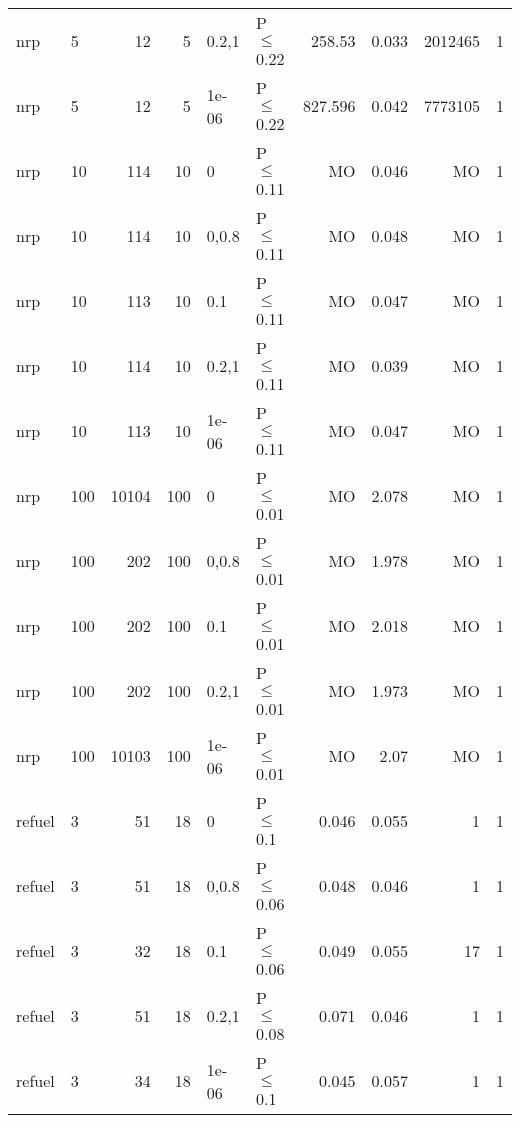 \begin{longtable}{llrrllrrrr}
 nrp           & 5        &     	12 &   5 & 0.2,1 & P$\leq$0.22  & 258.53  & 0.033   & 2012465 & 1    \\
 nrp           & 5        &     	12 &   5 & 1e-06 & P$\leq$0.22  & 827.596 & 0.042   & 7773105 & 1    \\
 nrp           & 10       &    	114 &  10 & 0     & P$\leq$0.11  & MO      & 0.046   & MO      & 1    \\
 nrp           & 10       &    	114 &  10 & 0,0.8 & P$\leq$0.11  & MO      & 0.048   & MO      & 1    \\
 nrp           & 10       &    	113 &  10 & 0.1   & P$\leq$0.11  & MO      & 0.047   & MO      & 1    \\
 nrp           & 10       &    	114 &  10 & 0.2,1 & P$\leq$0.11  & MO      & 0.039   & MO      & 1    \\
 nrp           & 10       &    	113 &  10 & 1e-06 & P$\leq$0.11  & MO      & 0.047   & MO      & 1    \\
 nrp           & 100      &  	10104 & 100 & 0     & P$\leq$0.01  & MO      & 2.078   & MO      & 1    \\
 nrp           & 100      &    	202 & 100 & 0,0.8 & P$\leq$0.01  & MO      & 1.978   & MO      & 1    \\
 nrp           & 100      &    	202 & 100 & 0.1   & P$\leq$0.01  & MO      & 2.018   & MO      & 1    \\
 nrp           & 100      &    	202 & 100 & 0.2,1 & P$\leq$0.01  & MO      & 1.973   & MO      & 1    \\
 nrp           & 100      &  	10103 & 100 & 1e-06 & P$\leq$0.01  & MO      & 2.07    & MO      & 1    \\
 refuel        & 3        &     	51 &  18 & 0     & P$\leq$0.1   & 0.046   & 0.055   & 1       & 1    \\
 refuel        & 3        &     	51 &  18 & 0,0.8 & P$\leq$0.06  & 0.048   & 0.046   & 1       & 1    \\
 refuel        & 3        &     	32 &  18 & 0.1   & P$\leq$0.06  & 0.049   & 0.055   & 17      & 1    \\
 refuel        & 3        &     	51 &  18 & 0.2,1 & P$\leq$0.08  & 0.071   & 0.046   & 1       & 1    \\
 refuel        & 3        &     	34 &  18 & 1e-06 & P$\leq$0.1   & 0.045   & 0.057   & 1       & 1    \\
\bottomrule
\end{longtable}
